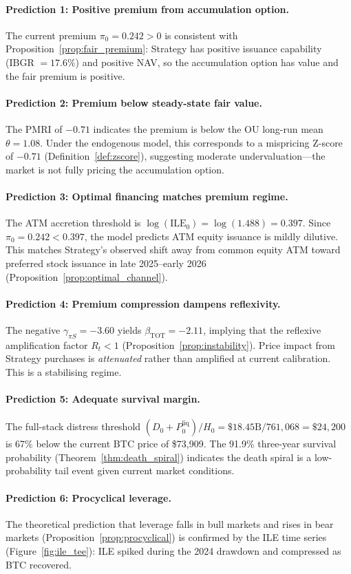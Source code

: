 \paragraph{Prediction 1: Positive premium from accumulation option.}
The current premium $\pi_0 = 0.242 > 0$ is consistent with
Proposition~\ref{prop:fair_premium}: Strategy has positive issuance
capability (IBGR $= 17.6\%$) and positive NAV, so the accumulation
option has value and the fair premium is positive.

\paragraph{Prediction 2: Premium below steady-state fair value.}
The PMRI of $-0.71$ indicates the premium is below the OU long-run mean
$\theta = 1.08$.  Under the endogenous model, this corresponds to a
mispricing Z-score of $-0.71$ (Definition~\ref{def:zscore}), suggesting
moderate undervaluation---the market is not fully pricing the
accumulation option.

\paragraph{Prediction 3: Optimal financing matches premium regime.}
The ATM accretion threshold is $\log(\mathrm{ILE}_0) = \log(1.488) = 0.397$.
Since $\pi_0 = 0.242 < 0.397$, the model predicts ATM equity issuance is
mildly dilutive.  This matches Strategy's observed shift away from common
equity ATM toward preferred stock issuance in late 2025--early 2026
(Proposition~\ref{prop:optimal_channel}).

\paragraph{Prediction 4: Premium compression dampens reflexivity.}
The negative $\gamma_{\pi S} = -3.60$ yields $\beta_{\mathrm{TOT}} = -2.11$,
implying that the reflexive amplification factor $R_t < 1$
(Proposition~\ref{prop:instability}).  Price impact from Strategy purchases
is \emph{attenuated} rather than amplified at current calibration.  This
is a stabilising regime.

\paragraph{Prediction 5: Adequate survival margin.}
The full-stack distress threshold
$(D_0 + P_0^{\mathrm{liq}})/H_0 = \$18.45\text{B}/761{,}068 = \$24{,}200$
is 67\% below the current BTC price of \$73,909.  The 91.9\% three-year
survival probability (Theorem~\ref{thm:death_spiral}) indicates the
death spiral is a low-probability tail event given current market
conditions.

\paragraph{Prediction 6: Procyclical leverage.}
The theoretical prediction that leverage falls in bull markets and rises in
bear markets (Proposition~\ref{prop:procyclical}) is confirmed by the
ILE time series (Figure~\ref{fig:ile_tee}): ILE spiked during the
2024 drawdown and compressed as BTC recovered.
